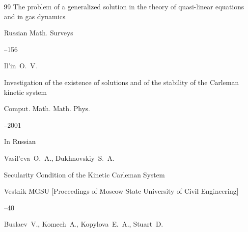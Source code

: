 \begin{thebibliography}{99}
\paper The problem of a generalized solution in the theory of quasi-linear equations and in gas dynamics



\jour Russian Math. Surveys




--156





\by Il'in~O.~V.

\paper Investigation of the existence of solutions and of the stability of the Carleman kinetic system


\jour Comput. Math. Math. Phys.




--2001











\lang In Russian

\by Vasil'eva~O.~A., Dukhnovskiy~S.~A.

\paper Secularity Condition of the Kinetic Carleman System

\jour Vestnik MGSU \rm [Proceedings of Moscow State University of Civil Engineering]



--40





\by Buslaev~V., Komech~A., Kopylova~E.~A., Stuart~D. 


\end{thebibliography}
